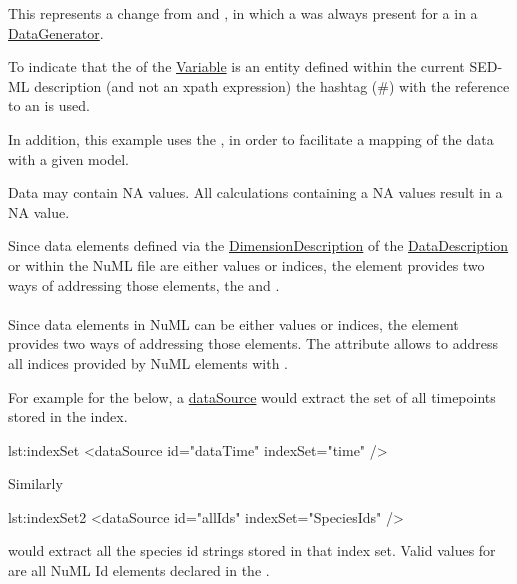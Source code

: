This represents a change from \LoneVone and \LoneVtwo, in which a  was always present for a  in a \hyperref[class:dataGenerator]{DataGenerator}.

To indicate that the \hyperref[sec:target]{} of the \hyperref[class:variable]{Variable} is an entity defined within the current SED-ML description (and not an xpath expression) the hashtag (\#) with the reference to an \hyperref[type:id]{} is used. 

In addition, this example uses the \hyperref[sec:modelReference]{}, in order to facilitate a mapping of the data with a given model. 

Data may contain NA values. All calculations containing a NA values result in a NA value.

Since data elements defined via the \hyperref[class:dimensionDescription]{DimensionDescription} of the \hyperref[class:dataDescription]{DataDescription} or within the NuML file are either values or indices, the \SedDataSource element provides two ways of addressing those elements, the \hyperref[sec:indexSet]{} and \hyperref[sec:listOfSlices]{}. 

\paragraph*{}
\label{sec:indexSet}
Since data elements in NuML can be either values or indices, the \SedDataSource element provides two ways of addressing those elements. The  attribute allows to address all indices provided by NuML elements with . 

For example for the   below, a \hyperref[class:dataSource]{dataSource} would extract the set of all timepoints stored in the index.

\begin{myXmlLst}{}{lst:indexSet}
<dataSource id="dataTime" indexSet="time" />
\end{myXmlLst} 

Similarly

\begin{myXmlLst}{}{lst:indexSet2}
<dataSource id="allIds" indexSet="SpeciesIds" />
\end{myXmlLst} 

would extract all the species id strings stored in that index set. Valid values for  are all NuML Id elements declared in the . 

